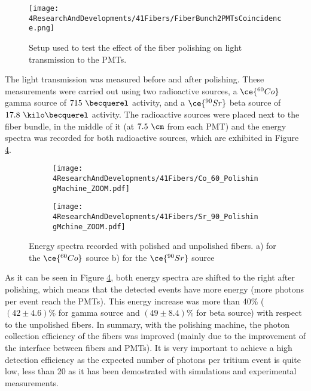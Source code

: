 \begin{figure}[]
\centering
\texttt{[image: 4ResearchAndDevelopments/41Fibers/FiberBunch2PMTsCoincidence.png]}
\caption{Setup used to test the effect of the fiber polishing on light transmission to the PMTs.\label{fig:BunchWith2PMTsCoincidence}}
\end{figure}

The light transmission was measured before and after polishing. These measurements were carried out using two radioactive sources, a $\ce{^{60}Co}$ gamma source of $715~\becquerel$ activity, and a $\ce{^{90}Sr}$ beta source of $17.8~\kilo\becquerel$ activity. The radioactive sources were placed next to the fiber bundle, in the middle of it (at $7.5~\cm$ from each PMT) and the energy spectra was recorded for both radioactive sources, which are exhibited in Figure \ref{fig:ResultsOfPolishingMachine}.

\begin{figure}
\centering
    \begin{subfigure}[b]{1\textwidth}
    \centering
    \texttt{[image: 4ResearchAndDevelopments/41Fibers/Co\_60\_PolishingMachine\_ZOOM.pdf]}  
    \caption{\label{subfig:EnergySpectrumCo60PolishingTest}}
    \end{subfigure}
    \hfill
    \begin{subfigure}[b]{1\textwidth}
    \centering
    \texttt{[image: 4ResearchAndDevelopments/41Fibers/Sr\_90\_PolishingMchine\_ZOOM.pdf]}  
    \caption{\label{subfig:EnergySpectrumSr90PolishingTest}}
    \end{subfigure}
 \caption{Energy spectra recorded with polished and unpolished fibers. a) for the $\ce{^{60}Co}$ source b) for the $\ce{^{90}Sr}$ source}
 \label{fig:ResultsOfPolishingMachine}
\end{figure}

As it can be seen in Figure \ref{fig:ResultsOfPolishingMachine}, both energy spectra are shifted to the right after polishing, which means that the detected events have more energy (more photons per event reach the PMTs). This energy increase was more than 40\% ($(42 \pm 4.6)\%$ for gamma source and $(49 \pm 8.4)\%$ for beta source) with respect to the unpolished fibers. In summary, with the polishing machine, the photon collection efficiency of the fibers was improved  (mainly due to the improvement of the interface between fibers and PMTs). It is very important to achieve a high detection efficiency as the expected number of photons per tritium event is quite low, less than 20 as it has been demostrated with simulations and experimental measurements.